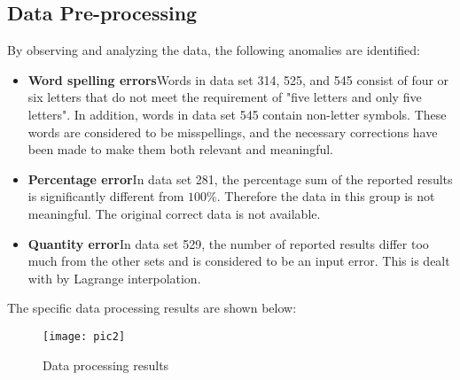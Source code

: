 \documentclass[12pt]{article}  %
\begin{document}
\subsection{Data Pre-processing}
By observing and analyzing the data, the following anomalies are identified:

\begin{itemize}
	\setlength{\parsep}{0ex} %
	\setlength{\topsep}{2ex} %
	\setlength{\itemsep}{1ex} %
	\item \textbf{Word spelling errors}\quad Words in data set 314, 525, and 545 consist of four or six letters that do not meet the requirement of "five letters and only five letters". In addition, words in data set 545 contain non-letter symbols. These words are considered to be misspellings, and the necessary corrections have been made to make them both relevant and meaningful.
	
	\item \textbf{Percentage error}\quad In data set 281, the percentage sum of the reported results is significantly different from $100\%$. Therefore the data in this group is not meaningful. The original correct data is not available.
	
	\item \textbf{Quantity error}\quad In data set 529, the number of reported results differ too much from the other sets and is considered to be an input error. This is dealt with by Lagrange interpolation.
	
\end{itemize}
The specific data processing results are shown below:
\begin{figure}[H]  %
	\centering  %
	\texttt{[image: pic2]} %
	\caption{Data processing results}  
	\label{pic2}
\end{figure}
\vspace{-0.5cm}
\end{document}
